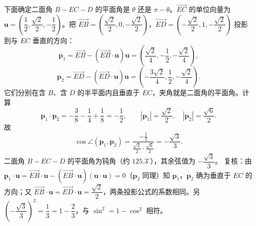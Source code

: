 \begin{answer}
下面确定二面角 $B-EC-D$ 的平面角是 $\theta$ 还是 $\pi-\theta$。$\overrightarrow{EC}$ 的单位向量为 $\boldsymbol u=\left(\dfrac12,\dfrac{\sqrt2}{2},-\dfrac12\right)$。把 $\overrightarrow{EB}=\left(\dfrac{\sqrt2}{2},0,-\dfrac{\sqrt2}{2}\right)$，$\overrightarrow{ED}=\left(-\dfrac{\sqrt2}{2},1,-\dfrac{\sqrt2}{2}\right)$ 投影到与 $EC$ 垂直的方向：
\nopagebreak[4]
\[\boldsymbol p_1=\overrightarrow{EB}-\left(\overrightarrow{EB}\cdot\boldsymbol u\right)\boldsymbol u=\left(\frac{\sqrt2}{4},-\frac12,-\frac{\sqrt2}{4}\right),\]
\nopagebreak[4]
\[\boldsymbol p_2=\overrightarrow{ED}-\left(\overrightarrow{ED}\cdot\boldsymbol u\right)\boldsymbol u=\left(-\frac{3\sqrt2}{4},\frac12,-\frac{\sqrt2}{4}\right).\]
它们分别在含 $B$、含 $D$ 的半平面内且垂直于 $EC$，夹角就是二面角的平面角。计算
\nopagebreak[4]
\[\boldsymbol p_1\cdot\boldsymbol p_2=-\frac38-\frac14+\frac18=-\frac12,\qquad |\boldsymbol p_1|=\frac{\sqrt2}{2},\quad |\boldsymbol p_2|=\frac{\sqrt6}{2}.\]
故
\nopagebreak[4]
\[\cos\angle\left(\boldsymbol p_1,\boldsymbol p_2\right)=\frac{-\frac12}{\frac{\sqrt2}{2}\cdot\frac{\sqrt6}{2}}=-\frac{\sqrt3}{3}.\]
二面角 $B-EC-D$ 的平面角为钝角（约 $125.3^\circ$），其余弦值为 $-\dfrac{\sqrt3}{3}$。
复核：由 $\boldsymbol p_1\cdot\boldsymbol u=\overrightarrow{EB}\cdot\boldsymbol u-\left(\overrightarrow{EB}\cdot\boldsymbol u\right)\left(\boldsymbol u\cdot\boldsymbol u\right)=0$（$\boldsymbol p_2$ 同理）知 $\boldsymbol p_1$，$\boldsymbol p_2$ 确为垂直于 $EC$ 的方向；又 $\overrightarrow{EB}\cdot\boldsymbol u=\overrightarrow{ED}\cdot\boldsymbol u=\dfrac{\sqrt2}{2}$，两条投影公式的系数相同。另 $\left(-\dfrac{\sqrt3}{3}\right)^2=\dfrac13=1-\dfrac23$，与 $\sin^2=1-\cos^2$ 相符。


\end{answer}
